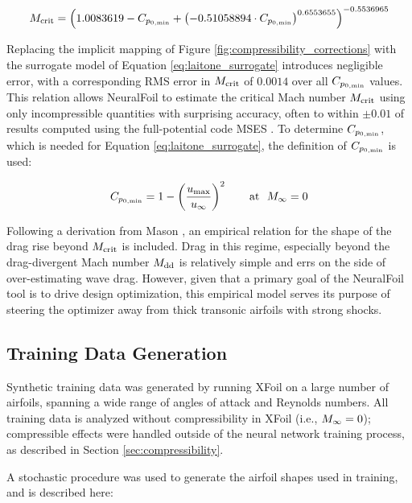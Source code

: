 \documentclass[conf]{new-aiaa}
\begin{document}
    \begin{equation}
        M_{\rm crit} = \left(
        1.0083619
        - C_{p_{0,\rm min}}
        + \left(-0.51058894 \cdot C_{p_{0,\rm min}} \right)^{0.6553655}
        \right)^{-0.5536965}
        \label{eq:laitone_surrogate}
    \end{equation}

    Replacing the implicit mapping of Figure \ref{fig:compressibility_corrections} with the surrogate model of Equation \ref{eq:laitone_surrogate} introduces negligible error, with a corresponding RMS error in $M_{\rm crit}$ of $0.0014$ over all $C_{p_{0,\rm min}}$ values. This relation allows NeuralFoil to estimate the critical Mach number $M_{\rm crit}$ using only incompressible quantities with surprising accuracy, often to within $\pm 0.01$ of results computed using the full-potential code MSES \cite{mses}. To determine $C_{p_{0,\rm min}}$, which is needed for Equation \ref{eq:laitone_surrogate}, the definition of $C_{p_{0,\rm min}}$ is used:

    \begin{equation}
        C_{p_{0,\rm min}} = 1 - \left( \frac{u_{\rm max}}{u_\infty} \right)^2 \qquad \text{at }\ M_\infty = 0
    \end{equation}

    Following a derivation from Mason \cite{mason_transonic_2006}, an empirical relation for the shape of the drag rise beyond $M_{\rm crit}$ is included. Drag in this regime, especially beyond the drag-divergent Mach number $M_{\rm dd}$ is relatively simple and errs on the side of over-estimating wave drag. However, given that a primary goal of the NeuralFoil tool is to drive design optimization, this empirical model serves its purpose of steering the optimizer away from thick transonic airfoils with strong shocks.

    \subsection{Training Data Generation}
    \label{sec:training-data}

    Synthetic training data was generated by running XFoil on a large number of airfoils, spanning a wide range of angles of attack and Reynolds numbers. All training data is analyzed without compressibility in XFoil (i.e., $M_\infty=0$); compressible effects were handled outside of the neural network training process, as described in Section \ref{sec:compressibility}.

    A stochastic procedure was used to generate the airfoil shapes used in training, and is described here:
\end{document}
